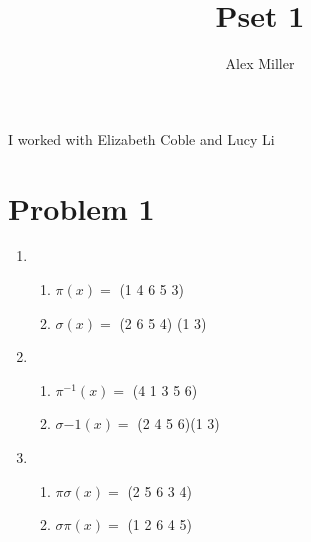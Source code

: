 \documentclass[]{article}
\title{Pset 1}
\author{Alex Miller}
\begin{document}
\maketitle

I worked with Elizabeth Coble and Lucy Li

\section{Problem 1}
\begin{enumerate}
	\item \
	\begin{enumerate}
		\item $\pi(x) = $ (1 4 6 5 3)
		\item $\sigma(x) = $ (2 6 5 4) (1 3)
	\end{enumerate}
	\item \
	\begin{enumerate}
		\item $\pi^{-1}(x) = $ (4 1 3 5 6)
		\item $\sigma{-1}(x) = $ (2 4 5 6)(1 3)
	\end{enumerate}
	\item \
	\begin{enumerate}
		\item $\pi\sigma(x) = $ (2 5 6 3 4)
		\item $\sigma\pi(x) = $ (1 2 6 4 5)
	\end{enumerate}
\end{enumerate}
\end{document}
